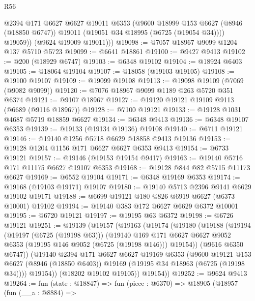 \begin{lexlean}{R56}
\begin{coremodule}
            @2394
            @171
            @6627
            @6627
            @19011
            @6353
            (@9600
              @18999
              @153
              @6627
              (@8946 (@18850 @6747))
              @19011
              (@19051 @34 @18995 (@6725 (@19054 @34))))
            @19059))
        (@9624 @19009 @19011)))
@19098 := @7057 @18967 @9099 @1204 @137 @5710 @5723
@19099 := @6641 @18861
@19100 := @9427 @9413
@19102 := @200 (@18929 @6747)
@19103 := @6348 @19102
@19104 := @18924 @6403
@19105 := @18064 @19104
@19107 := @18058 (@19103 @19105)
@19108 := @19100 @19107
@19109 := @19099 @19108
@19113 := @19098 @19109 (@7069 (@9082 @9099))
@19120 := @7076 @18967 @9099 @1189 @263 @5720 @351 @6374
@19121 := @9107 @18967
@19127 := @19120 @19121 @19109 @9113 (@6689 (@9116 @18967))
@19128 := @7100 @19121
@19133 := @19128 @1031 @4687 @5719 @18859 @6627
@19134 := @6348 @9413
@19136 := @6348 @19107 @6353
@19139 := @19133 (@19134 @19136) @19108
@19140 := @6711 @19121
@19146 := @19140 @1256 @5718 @6629 @18858 @9413 @19136
@19153 := @19128 @1204 @1156 @171 @6627 @6627 @6353 @9413
@19154 := @6733 @19121
@19157 := @19146 (@19153 @19154 @9417)
@19163 := @19140 @5716 @171 @11175 @6627 @19107 @6353
@19168 := @19128 @844 @82 @5715 @11173 @6627
@19169 := @6552 @19104
@19171 := @6348 @19169 @6353
@19174 := @19168 (@19103 @19171) @19107
@19180 := @19140 @5713 @2396 @9141 @6629 @19102 @19171
@19188 := @6699 @19121 @180 @826 @6919 @6627 (@6373 @10001) @19102
@19194 := @19140 @383 @172 @6627 @6629 @6372 @10001
@19195 := @6720 @19121
@19197 := @19195 @63 @6372
@19198 := @6726 @19121
@19251 := @19139
    (@19157
      (@19163
        (@19174
          (@19180
            (@19188
              (@19194
                (@19197 (@6725 (@19198 @63)))
                (@19140
                  @169
                  @171
                  @6627
                  @6627
                  @9052
                  @6353
                  (@19195 @146 @9052 (@6725 (@19198 @146)))
                  @19154))
              (@9616 @6350 @6747))
            (@19140
              @2394
              @171
              @6627
              @6627
              @19169
              @6353
              (@9600
                @19121
                @153
                @6627
                (@8946 (@18850 @6403))
                @19169
                (@19195 @34 @18963 (@6725 (@19198 @34))))
              @19154))
          (@18202 @19102 @19105))
        @19154))
@19252 := @9624 @9413
@19264 := fun (state : @18847) =>
  fun (piece : @6370) =>
  @18905
    (@18957
      (fun (__a : @8884) =>

\end{coremodule}
\end{lexlean}
